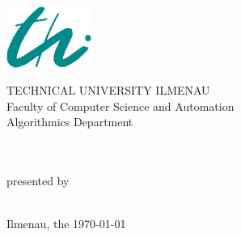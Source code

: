\begin{titlepage}

\begin{center}
\includegraphics[height=2cm]{pics/logo-thi.jpg}
\vspace{1cm}

TECHNICAL UNIVERSITY ILMENAU\\
Faculty of Computer Science and Automation\\
Algorithmics Department

\vspace{4cm}

{\large \sathema} \\ 
\vspace{1cm}
{\LARGE \normalfont \bfseries \layer} \\
\vspace{1cm}
{presented by} \\
\vspace{0.5cm}
{\large \saauthor}\\
{\large \matrikel}
\vspace{2cm}

\vspace{5cm}

Ilmenau, the \today
\end{center}

\end{titlepage}
